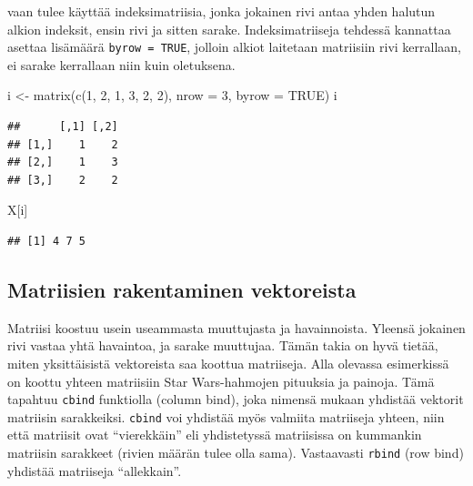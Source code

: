 \documentclass[
]{book}
\newenvironment{Shaded}{\begin{snugshade}}{\end{snugshade}}
\newcommand{\AttributeTok}[1]{\textcolor[rgb]{0.77,0.63,0.00}{#1}}
\newcommand{\ConstantTok}[1]{\textcolor[rgb]{0.00,0.00,0.00}{#1}}
\newcommand{\DecValTok}[1]{\textcolor[rgb]{0.00,0.00,0.81}{#1}}
\newcommand{\FunctionTok}[1]{\textcolor[rgb]{0.00,0.00,0.00}{#1}}
\newcommand{\NormalTok}[1]{#1}
\newcommand{\OtherTok}[1]{\textcolor[rgb]{0.56,0.35,0.01}{#1}}
\begin{document}
vaan tulee käyttää indeksimatriisia, jonka jokainen rivi antaa yhden halutun alkion indeksit, ensin rivi ja sitten sarake. Indeksimatriiseja tehdessä kannattaa asettaa lisämäärä \texttt{byrow\ =\ TRUE}, jolloin alkiot laitetaan matriisiin rivi kerrallaan, ei sarake kerrallaan niin kuin oletuksena.

\begin{Shaded}
\begin{Highlighting}[]
\NormalTok{i }\OtherTok{\textless{}{-}} \FunctionTok{matrix}\NormalTok{(}\FunctionTok{c}\NormalTok{(}\DecValTok{1}\NormalTok{, }\DecValTok{2}\NormalTok{, }\DecValTok{1}\NormalTok{, }\DecValTok{3}\NormalTok{, }\DecValTok{2}\NormalTok{, }\DecValTok{2}\NormalTok{), }\AttributeTok{nrow =} \DecValTok{3}\NormalTok{, }\AttributeTok{byrow =} \ConstantTok{TRUE}\NormalTok{)}
\NormalTok{i}
\end{Highlighting}
\end{Shaded}

\begin{verbatim}
##      [,1] [,2]
## [1,]    1    2
## [2,]    1    3
## [3,]    2    2
\end{verbatim}

\begin{Shaded}
\begin{Highlighting}[]
\NormalTok{X[i]}
\end{Highlighting}
\end{Shaded}

\begin{verbatim}
## [1] 4 7 5
\end{verbatim}

\hypertarget{matriisien-rakentaminen-vektoreista}{%
\subsection{Matriisien rakentaminen vektoreista}\label{matriisien-rakentaminen-vektoreista}}

Matriisi koostuu usein useammasta muuttujasta ja havainnoista. Yleensä jokainen rivi vastaa yhtä havaintoa, ja sarake muuttujaa. Tämän takia on hyvä tietää, miten yksittäisistä vektoreista saa koottua matriiseja. Alla olevassa esimerkissä on koottu yhteen matriisiin Star Wars-hahmojen pituuksia ja painoja. Tämä tapahtuu \texttt{cbind} funktiolla (column bind), joka nimensä mukaan yhdistää vektorit matriisin sarakkeiksi. \texttt{cbind} voi yhdistää myös valmiita matriiseja yhteen, niin että matriisit ovat ``vierekkäin'' eli yhdistetyssä matriisissa on kummankin matriisin sarakkeet (rivien määrän tulee olla sama). Vastaavasti \texttt{rbind} (row bind) yhdistää matriiseja ``allekkain''.
\end{document}
